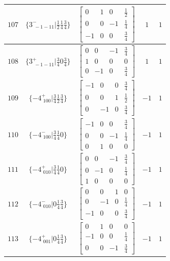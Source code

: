 \documentclass[fleqn,8pt]{jsarticle}
\begin{document}
\begin{longtable}{ccccc}
$ 107 $ & $ \{3^{-}_{\,\,-1-11}|\frac{1}{2} \frac{1}{4} \frac{3}{4}\} $ & $ \begin{bmatrix} 0 & 1 & 0 & \frac{1}{2} \\ 0 & 0 & -1 & \frac{1}{4} \\ -1 & 0 & 0 & \frac{3}{4} \end{bmatrix} $ & $ 1 $ & $ 1 $ \\ \hline
$ 108 $ & $ \{3^{+}_{\,\,-1-11}|\frac{3}{4} 0 \frac{3}{4}\} $ & $ \begin{bmatrix} 0 & 0 & -1 & \frac{3}{4} \\ 1 & 0 & 0 & 0 \\ 0 & -1 & 0 & \frac{3}{4} \end{bmatrix} $ & $ 1 $ & $ 1 $ \\ \hline
$ 109 $ & $ \{-4^{+}_{\,\,100}|\frac{3}{4} \frac{1}{2} \frac{3}{4}\} $ & $ \begin{bmatrix} -1 & 0 & 0 & \frac{3}{4} \\ 0 & 0 & 1 & \frac{1}{2} \\ 0 & -1 & 0 & \frac{3}{4} \end{bmatrix} $ & $ -1 $ & $ 1 $ \\ \hline
$ 110 $ & $ \{-4^{-}_{\,\,100}|\frac{3}{4} \frac{1}{4} 0\} $ & $ \begin{bmatrix} -1 & 0 & 0 & \frac{3}{4} \\ 0 & 0 & -1 & \frac{1}{4} \\ 0 & 1 & 0 & 0 \end{bmatrix} $ & $ -1 $ & $ 1 $ \\ \hline
$ 111 $ & $ \{-4^{+}_{\,\,010}|\frac{3}{4} \frac{1}{4} 0\} $ & $ \begin{bmatrix} 0 & 0 & -1 & \frac{3}{4} \\ 0 & -1 & 0 & \frac{1}{4} \\ 1 & 0 & 0 & 0 \end{bmatrix} $ & $ -1 $ & $ 1 $ \\ \hline
$ 112 $ & $ \{-4^{-}_{\,\,010}|0 \frac{1}{4} \frac{3}{4}\} $ & $ \begin{bmatrix} 0 & 0 & 1 & 0 \\ 0 & -1 & 0 & \frac{1}{4} \\ -1 & 0 & 0 & \frac{3}{4} \end{bmatrix} $ & $ -1 $ & $ 1 $ \\ \hline
$ 113 $ & $ \{-4^{+}_{\,\,001}|0 \frac{1}{4} \frac{3}{4}\} $ & $ \begin{bmatrix} 0 & 1 & 0 & 0 \\ -1 & 0 & 0 & \frac{1}{4} \\ 0 & 0 & -1 & \frac{3}{4} \end{bmatrix} $ & $ -1 $ & $ 1 $ \\ \hline

\end{longtable}
\end{document}
